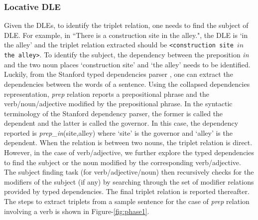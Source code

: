 \documentclass{acm_proc_article-sp}
\begin{document}
\subsubsection*{Locative DLE}
Given the DLEs, to identify the triplet relation, one needs to find the subject of DLE. For example, in ``There is a construction site in the alley.", the DLE is `in the alley' and the triplet relation extracted should be \texttt{<construction site $in$ the alley>}. To  identify the subject, the dependency between the preposition \textit{in} and the two noun places `construction site' and `the alley' needs to be identified. Luckily, from the Stanford typed dependencies parser \cite{marneffe:stanford}, one can extract the dependencies between the words of a sentence. Using the collapsed dependencies representation, \textit{prep} relation reports a prepositional phrase and the verb/noun/adjective modified by the prepositional phrase. In the syntactic terminology of the Stanford dependency parser, the former is called the dependent and the latter is called the governor. In this case, the dependency reported is \textit{prep\_in}(site,alley) where `site' is the governor and `alley' is the dependent. When the relation is between two nouns, the triplet relation is direct. 
However, in the case of verb/adjective, we further explore the typed dependencies to find the subject or the noun modified by the corresponding verb/adjective. The subject finding task (for verb/adjective/noun) then recursively checks for the modifiers of the subject (if any) by searching through the set of modifier relations provided by typed dependencies. The final triplet relation is reported thereafter. The steps to extract triplets from a sample sentence for the case of \textit{prep} relation involving a verb is shown in Figure-\ref{fig:phase1}. 
 
\end{document}
